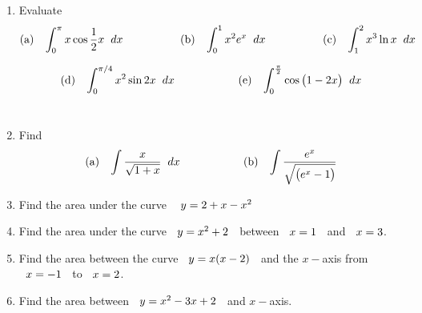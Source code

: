 \documentclass[11pt,a4paper]{article}
\begin{document}
\begin{enumerate}
\item Evaluate
$$(\text{a})\hspace{0.3cm} \int^{\pi}_0 x \cos \dfrac{1}{2}x\hspace{0.2cm}dx \hspace{1.8cm} (\text{b})\hspace{0.3cm} \int^1_0x^2e^{x}\hspace{0.2cm}dx\hspace{1.8cm} (\text{c})\hspace{0.3cm} \int^2_1x^3\ln x \hspace{0.2cm}dx$$

$$(\text{d})\hspace{0.3cm} \int^{\pi/4}_0x^2\sin 2x\hspace{0.2cm} dx\hspace{2cm} (\text{e})\hspace{0.3cm} \int^{\frac{\pi}{2}}_0\cos \big(1- 2x\big)\hspace{0.2cm}dx$$\\


\item Find
$$(\text{a})\hspace{0.3cm} \int \dfrac{x}{\sqrt{1 + x}}\hspace{0.2cm}dx \hspace{2cm} (\text{b})\hspace{0.3cm} \int \dfrac{e^x}{\sqrt{\big(e^x - 1\big)}}$$


\item Find the area under the curve $\hspace{0.3cm} y = 2 + x - x^2$

\item Find the area under the curve $\hspace{0.2cm} y = x^2 + 2\hspace{0.2cm} $ between $\hspace{0.2cm} x = 1\hspace{0.2cm}$ and $\hspace{0.2cm} x = 3$.

\item Find the area between the curve $\hspace{0.2cm} y = x ( x - 2)\hspace{0.2cm}$ and the $x-$axis from $\hspace{0.2cm} x = -1\hspace{0.2cm}$ to $\hspace{0.2cm} x = 2$.

\item Find the area between $\hspace{0.2cm} y = x^2 - 3x + 2\hspace{0.2cm}$ and $x-$axis.


\end{enumerate}
\end{document}
